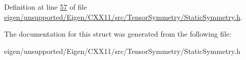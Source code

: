 Definition at line \hyperlink{eigen_2unsupported_2_eigen_2_c_x_x11_2src_2_tensor_symmetry_2_static_symmetry_8h_source_l00057}{57} of file \hyperlink{eigen_2unsupported_2_eigen_2_c_x_x11_2src_2_tensor_symmetry_2_static_symmetry_8h_source}{eigen/unsupported/\+Eigen/\+C\+X\+X11/src/\+Tensor\+Symmetry/\+Static\+Symmetry.\+h}.



The documentation for this struct was generated from the following file\+:\begin{DoxyCompactItemize}
\item 
eigen/unsupported/\+Eigen/\+C\+X\+X11/src/\+Tensor\+Symmetry/\+Static\+Symmetry.\+h\end{DoxyCompactItemize}
